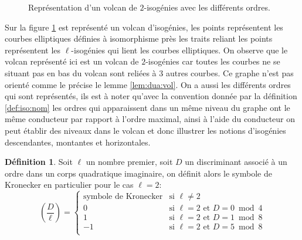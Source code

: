 \documentclass[10pt,a4paper]{book}
\theoremstyle{plain}
\theoremstyle{definition}
\theoremstyle{definition}
\theoremstyle{definition}
\theoremstyle{definition}
\newtheorem{defi}[thm]{Définition}
\theoremstyle{remark}
\theoremstyle{remark}
\theoremstyle{definition}
\begin{document}
\begin{figure}
\begin{center}
\begin{tikzpicture}[scale=0.60]


\end{tikzpicture}
\end{center}
\caption{Représentation d'un volcan de $2$-isogénies avec les différents ordres.}		
\label{fig:ord:vol}
\end{figure}
Sur la figure \ref{fig:ord:vol} est représenté un volcan d'isogénies, les points représentent les courbes elliptiques définies à isomorphisme près les traits reliant les points représentent les $\ell$-isogénies qui lient les courbes elliptiques. On observe que le volcan représenté ici est un volcan de $2$-isogénies car toutes les courbes ne se situant pas en bas du volcan sont reliées à $3$ autres courbes. Ce graphe n'est pas orienté comme le précise le lemme \ref{lem:dua:vol}. On a aussi les différents ordres qui sont représentés, ils est à noter qu'avec la convention donnée par la définition \ref{def:iso:nom} les ordres qui apparaissent dans un même niveau du graphe ont le même conducteur par rapport à l'ordre maximal, ainsi à l'aide du conducteur on peut établir des niveaux dans le volcan et donc illustrer les notions d'isogénies descendantes, montantes et horizontales. 

\begin{defi}
Soit $\ell$ un nombre premier, soit $D$ un discriminant associé à un ordre dans
un corps quadratique imaginaire, on définit alors le symbole de Kronecker en 
particulier pour le cas $\ell=2$:
\begin{equation*}
\left( \frac{D}{\ell} \right)= \begin{cases}
  \text{symbole de Kronecker} & \text{si } \ell\neq 2 \\
0 & \text{si } \ell=2 \text{ et } D=0 \bmod 4 \\
1 & \text{si } \ell=2 \text{ et } D=1 \bmod 8 \\
-1 & \text{si } \ell=2 \text{ et } D=5 \bmod 8 \\
\end{cases}
\end{equation*}
\end{defi}
\end{document}
